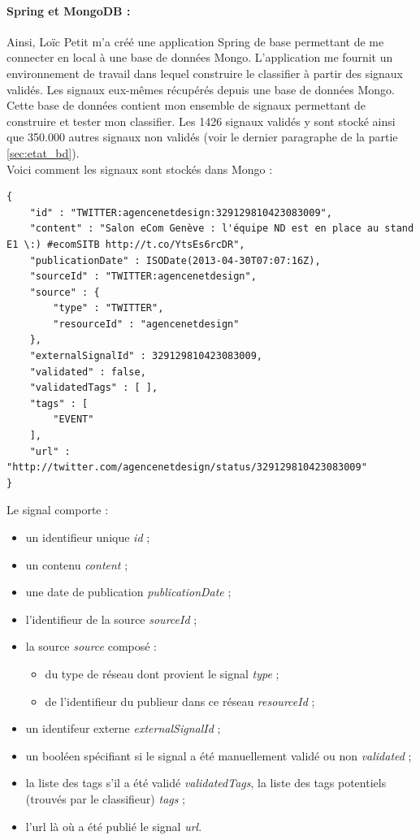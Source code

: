         \paragraph{Spring et MongoDB :}
            Ainsi, Loïc Petit m'a créé une application Spring de base permettant de me connecter en local à une base de données Mongo. L'application me fournit un environnement de travail dans lequel construire le classifier à partir des signaux validés. Les signaux eux-mêmes récupérés depuis une base de données Mongo. Cette base de données contient mon ensemble de signaux permettant de construire et tester mon classifier. Les 1426 signaux validés y sont stocké ainsi que 350.000 autres signaux non validés (voir le dernier paragraphe de la partie \ref{sec:etat_bd}).\\

        Voici comment les signaux sont stockés dans Mongo :
\begin{verbatim}
{
    "id" : "TWITTER:agencenetdesign:329129810423083009",
    "content" : "Salon eCom Genève : l'équipe ND est en place au stand E1 \:) #ecomSITB http://t.co/YtsEs6rcDR",
    "publicationDate" : ISODate(2013-04-30T07:07:16Z),
    "sourceId" : "TWITTER:agencenetdesign",
    "source" : {
        "type" : "TWITTER",
        "resourceId" : "agencenetdesign"
    },
    "externalSignalId" : 329129810423083009,
    "validated" : false,
    "validatedTags" : [ ],
    "tags" : [
        "EVENT"
    ],
    "url" : "http://twitter.com/agencenetdesign/status/329129810423083009"
}
\end{verbatim}

        Le signal comporte :
        \begin{itemize}
            \item un identifieur unique \textit{id} ;
            \item un contenu \textit{content} ;
            \item une date de publication \textit{publicationDate} ;
            \item l'identifieur de la source \textit{sourceId} ;
            \item la source \textit{source} composé :
            \begin{itemize}
                \item du type de réseau dont provient le signal \textit{type} ;
                \item de l'identifieur du publieur dans ce réseau \textit{resourceId} ;
            \end{itemize}
            \item un identifeur externe \textit{externalSignalId} ;
            \item un booléen spécifiant si le signal a été manuellement validé ou non \textit{validated} ;
            \item la liste des tags s'il a été validé \textit{validatedTags}, la liste des tags potentiels (trouvés par le classifieur) \textit{tags} ;
            \item l'url là où a été publié le signal \textit{url}.
        \end{itemize}


